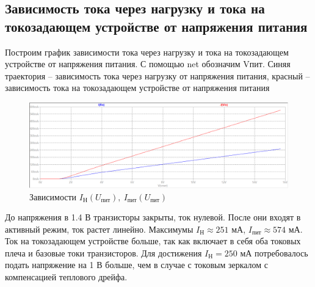 \documentclass[a4paper, 12pt]{article}
\begin{document}
    \subsection{Зависимость тока через нагрузку и тока на токозадающем устройстве от напряжения питания}
    Построим график зависимости тока через нагрузку и тока на токозадающем устройстве от напряжения питания.
    С помощью net обозначим Vпит. Синяя траектория -- зависимость тока через нагрузку от напряжения питания,
    красный -- зависимость тока на токозадающем устройстве от напряжения питания
    \begin{figure}[H]
        \centering
        \includegraphics[scale=0.46]{2task_Iн(Vпит)_Iпит(Vпит).png}
        \captionsetup{skip=0pt}
        \caption{Зависимости $I_\text{Н}\left( U_\text{пит} \right),\ I_\text{пит}\left( U_\text{пит} \right)$}
        \label{fig:2task_InVl_IlVl}
    \end{figure}
    \noindent До напряжения в 1.4 В транзисторы закрыты, ток нулевой. После они входят в активный режим,
    ток растет линейно. Максимумы $I_\text{Н}\approx251$ мА, $I_\text{пит}\approx574$ мА. Ток
    на токозадающем устройстве больше, так как включает в себя оба токовых плеча и базовые токи транзисторов.
    Для достижения $I_\text{Н}=250$ мА потребовалось подать напряжение на 1 В больше, чем в случае
    с токовым зеркалом с компенсацией теплового дрейфа.
\end{document}
